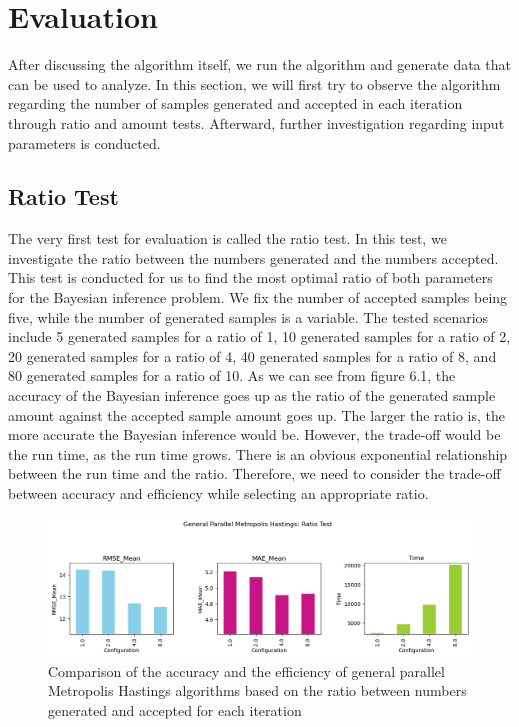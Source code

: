 \section{Evaluation}
After discussing the algorithm itself, we run the algorithm and generate data that can be used to analyze. In this section, we will first try to observe the algorithm regarding the number of samples generated and accepted in each iteration through ratio and amount tests. Afterward, further investigation regarding input parameters is conducted.

\subsection{Ratio Test}
The very first test for evaluation is called the ratio test. In this test, we investigate the ratio between the numbers generated and the numbers accepted. This test is conducted for us to find the most optimal ratio of both parameters for the Bayesian inference problem. We fix the number of accepted samples being five, while the number of generated samples is a variable. The tested scenarios include 5 generated samples for a ratio of 1, 10 generated samples for a ratio of 2, 20 generated samples for a ratio of 4, 40 generated samples for a ratio of 8, and 80 generated samples for a ratio of 10. As we can see from figure 6.1, the accuracy of the Bayesian inference goes up as the ratio of the generated sample amount against the accepted sample amount goes up. The larger the ratio is, the more accurate the Bayesian inference would be. However, the trade-off would be the run time, as the run time grows. There is an obvious exponential relationship between the run time and the ratio. Therefore, we need to consider the trade-off between accuracy and efficiency while selecting an appropriate ratio.

\begin{figure}[H]
    \centering
    \includegraphics[width=1\textwidth]{figures/gpmh/ratio_test.png}
    \captionsetup{width=.8\textwidth}
    \caption{Comparison of the accuracy and the efficiency of general parallel Metropolis Hastings algorithms based on the ratio between numbers generated and accepted for each iteration}
    \label{fig:enter-label}
\end{figure}

